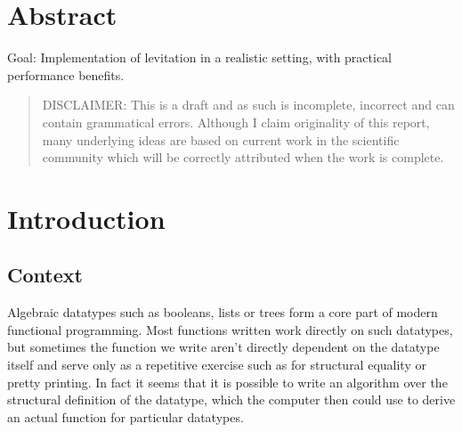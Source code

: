 \documentclass{ituthesis}
\begin{document}

\frontmatter

\thetitlepage
\newpage

\chapter*{Abstract}
Goal: Implementation of levitation in a realistic setting, with practical performance benefits.
\blockquote{DISCLAIMER: This is a draft and as such is incomplete, incorrect and can contain grammatical errors.
Although I claim originality of this report, many underlying ideas are based on current work in the scientific community which will be correctly attributed
when the work is complete.}

\cleardoublepage
\setcounter{tocdepth}{1}
\tableofcontents

\mainmatter

\midsloppy
\sloppybottom

\chapter{Introduction}
\label{cha:Intoduction}
\section{Context}
\label{sec:Context}
Algebraic datatypes such as booleans, lists or trees form a core part of modern functional programming.
Most functions written work directly on such datatypes, but sometimes the function we write aren't directly dependent on the datatype itself and serve only as a repetitive exercise such as for structural equality or pretty printing.
In fact it seems that it is possible to write an algorithm over the structural definition of the datatype, which the computer then could use to derive an actual function for particular datatypes.
\end{document}
